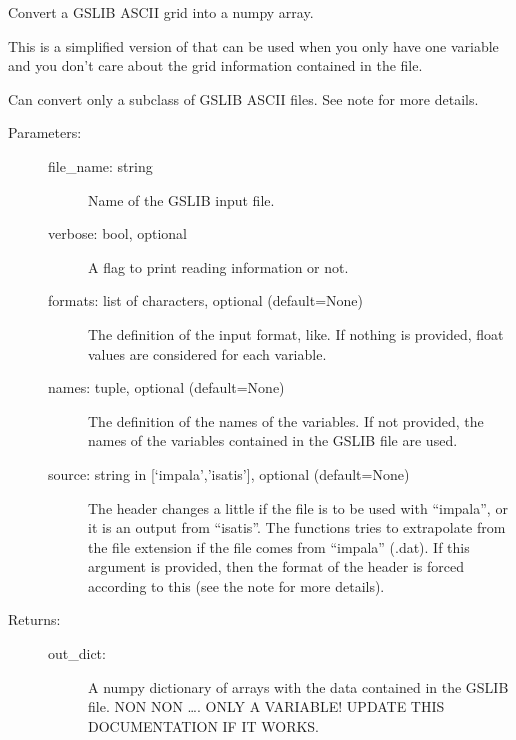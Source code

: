 \documentclass[letterpaper,10pt,english]{sphinxmanual}
\begin{document}
\begin{fulllineitems}
\label{\detokenize{appendices:s2Dcd.gslibnumpy.gslib2numpy_onevar}}
Convert a GSLIB ASCII grid into a numpy array.

This is a simplified version of  that can be used
when you only have one variable and you don’t care about the grid
information contained in the file.

Can convert only a subclass of GSLIB ASCII files.
See note for more details.
\begin{description}
\item[{Parameters:}] \leavevmode\begin{description}
\item[{file\_name: string}] \leavevmode
Name of the GSLIB input file.

\item[{verbose: bool, optional}] \leavevmode
A flag to print reading information or not.

\item[{formats: list of characters, optional (default=None)}] \leavevmode
The definition of the input format, 
like.
If nothing is provided, float values are considered for each
variable.

\item[{names: tuple, optional (default=None)}] \leavevmode
The definition of the names of the variables. If not provided,
the names of the variables contained in the GSLIB file are used.

\item[{source: string in {[}‘impala’,’isatis’{]}, optional (default=None)}] \leavevmode
The header changes a little if the file is to be used with 
“impala”, or it is an output from “isatis”.
The functions tries to extrapolate from the file extension if
the file comes from “impala” (.dat).
If this argument is provided, then the format of the header is
forced according to this (see the note for more details).

\end{description}

\item[{Returns:}] \leavevmode\begin{description}
\item[{out\_dict:}] \leavevmode
A numpy dictionary of arrays with the data contained in
the GSLIB file.  NON NON …. ONLY A VARIABLE! UPDATE THIS
DOCUMENTATION IF IT WORKS.


\end{description}
\end{description}
\end{fulllineitems}
\end{document}
